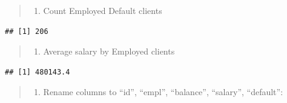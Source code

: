 \documentclass[
]{book}
\newenvironment{Shaded}{\begin{snugshade}}{\end{snugshade}}
\newcommand{\DecValTok}[1]{\textcolor[rgb]{0.00,0.00,0.81}{#1}}
\newcommand{\FunctionTok}[1]{\textcolor[rgb]{0.00,0.00,0.00}{#1}}
\newcommand{\NormalTok}[1]{#1}
\newcommand{\OtherTok}[1]{\textcolor[rgb]{0.56,0.35,0.01}{#1}}
\newcommand{\SpecialCharTok}[1]{\textcolor[rgb]{0.00,0.00,0.00}{#1}}
\providecommand{\tightlist}{%
  \setlength{\itemsep}{0pt}\setlength{\parskip}{0pt}}
\begin{document}
\begin{quote}
\begin{enumerate}
\def\labelenumi{\arabic{enumi}.}
\setcounter{enumi}{3}
\tightlist
\item
  Count Employed Default clients
\end{enumerate}
\end{quote}

\begin{Shaded}
\end{Shaded}

\begin{verbatim}
## [1] 206
\end{verbatim}

\begin{quote}
\begin{enumerate}
\def\labelenumi{\arabic{enumi}.}
\setcounter{enumi}{4}
\tightlist
\item
  Average salary by Employed clients
\end{enumerate}
\end{quote}

\begin{Shaded}
\end{Shaded}

\begin{verbatim}
## [1] 480143.4
\end{verbatim}

\begin{quote}
\begin{enumerate}
\def\labelenumi{\arabic{enumi}.}
\setcounter{enumi}{5}
\tightlist
\item
  Rename columns to ``id'', ``empl'', ``balance'', ``salary'', ``default'':
\end{enumerate}
\end{quote}
\end{document}
